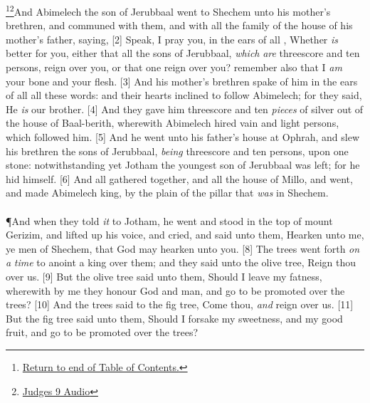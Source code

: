 \footnote{\textcolor[rgb]{0.00,0.25,0.00}{\hyperlink{JudgesTOC}{Return to end of Table of Contents.}}}\footnote{\href{https://audiobible.com/bible/judges_9.html}{\textcolor[cmyk]{0.99998,1,0,0}{Judges 9 Audio}}}\textcolor[cmyk]{0.99998,1,0,0}{And Abimelech the son of Jerubbaal went to Shechem unto his mother's brethren, and communed with them, and with all the family of the house of his mother's father, saying,}
[2] \textcolor[cmyk]{0.99998,1,0,0}{Speak, I pray you, in the ears of all , Whether \emph{is} better for you, either that all the sons of Jerubbaal, \emph{which} \emph{are} threescore and ten persons, reign over you, or that one reign over you? remember also that I \emph{am} your bone and your flesh.}
[3] \textcolor[cmyk]{0.99998,1,0,0}{And his mother's brethren spake of him in the ears of all  all these words: and their hearts inclined to follow Abimelech; for they said, He \emph{is} our brother.}
[4] \textcolor[cmyk]{0.99998,1,0,0}{And they gave him threescore and ten \emph{pieces} of silver out of the house of Baal-berith, wherewith Abimelech hired vain and light persons, which followed him.}
[5] \textcolor[cmyk]{0.99998,1,0,0}{And he went unto his father's house at Ophrah, and slew his brethren the sons of Jerubbaal, \emph{being} threescore and ten persons, upon one stone: notwithstanding yet Jotham the youngest son of Jerubbaal was left; for he hid himself.}
[6] \textcolor[cmyk]{0.99998,1,0,0}{And all  gathered together, and all the house of Millo, and went, and made Abimelech king, by the plain of the pillar that \emph{was} in Shechem.}\\
\\
\P \textcolor[cmyk]{0.99998,1,0,0}{And when they told \emph{it} to Jotham, he went and stood in the top of mount Gerizim, and lifted up his voice, and cried, and said unto them, Hearken unto me, ye men of Shechem, that God may hearken unto you.}
[8] \textcolor[cmyk]{0.99998,1,0,0}{The trees went forth \emph{on} \emph{a} \emph{time} to anoint a king over them; and they said unto the olive tree, Reign thou over us.}
[9] \textcolor[cmyk]{0.99998,1,0,0}{But the olive tree said unto them, Should I leave my fatness, wherewith by me they honour God and man, and go to be promoted over the trees?}
[10] \textcolor[cmyk]{0.99998,1,0,0}{And the trees said to the fig tree, Come thou, \emph{and} reign over us.}
[11] \textcolor[cmyk]{0.99998,1,0,0}{But the fig tree said unto them, Should I forsake my sweetness, and my good fruit, and go to be promoted over the trees?}
